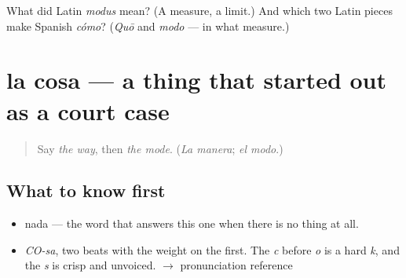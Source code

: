 \begin{tcolorbox}[breakable,colback=teal!4,colframe=teal!35!black,title={Before you move on}]
What did Latin \emph{modus} mean? (A measure, a limit.) And which two Latin pieces make Spanish \emph{cómo}? (\emph{Quō} and \emph{modo} — in what measure.)
\end{tcolorbox}
\section[la cosa]{la cosa — a thing that started out as a court case}

\label{lesson:ES-C331-cosa}



\begin{quote}
Say \emph{the way}, then \emph{the mode}. (\emph{La manera}; \emph{el modo}.)
\end{quote}

\subsection*{What to know first}
\begin{itemize}
\raggedright
  \item nada — the word that answers this one when there is no thing at all.
\end{itemize}

\begin{sounds}
\begin{itemize}
\raggedright
  \item \emph{CO-sa}, two beats with the weight on the first. The \emph{c} before \emph{o} is a hard \emph{k}, and the \emph{s} is crisp and unvoiced. $\to$ pronunciation reference
\end{itemize}
\end{sounds}

